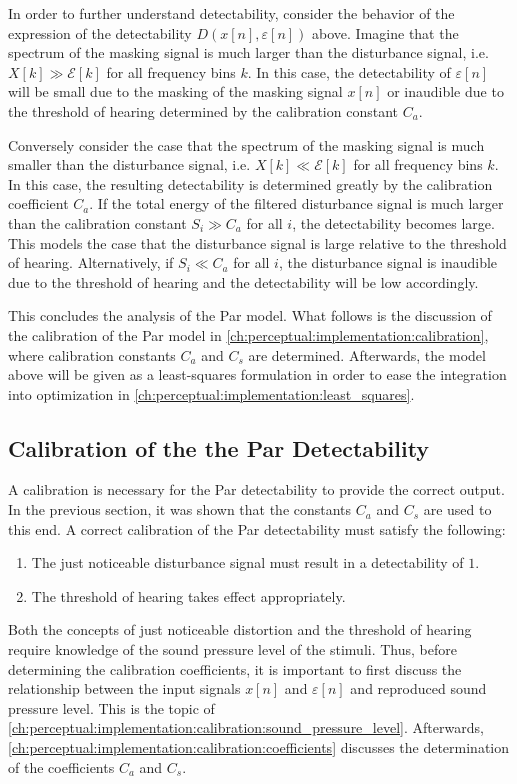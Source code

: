In order to further understand detectability, consider the behavior of the expression of the detectability $D(x[n],\varepsilon[n])$ above.
Imagine that the spectrum of the masking signal is much larger than the disturbance signal, 
i.e. $X[k] \gg \mathcal{E}[k]$ for all frequency bins $k$.
In this case, the detectability of $\varepsilon[n]$ will be small due to the masking of the masking signal $x[n]$ or
inaudible due to the threshold of hearing determined by the calibration constant $C_a$.

Conversely consider the case that the spectrum of the masking signal is much smaller than the disturbance signal,
i.e. $X[k] \ll \mathcal{E}[k]$ for all frequency bins $k$.
In this case, the resulting detectability is determined greatly by the calibration coefficient $C_a$. 
If the total energy of the filtered disturbance signal is much larger than the calibration constant 
$S_i \gg C_a$ for all $i$, the detectability becomes large.
This models the case that the disturbance signal is large relative to the threshold of hearing.
Alternatively, if $S_i \ll C_a$ for all $i$, the disturbance signal is inaudible due to the threshold of hearing and 
the detectability will be low accordingly.

This concludes the analysis of the Par model.
What follows is the discussion of the calibration of the Par model in \autoref{ch:perceptual:implementation:calibration},
where calibration constants $C_a$ and $C_s$ are determined.
Afterwards, the model above will be given as a least-squares formulation in order to ease the integration
into optimization in \autoref{ch:perceptual:implementation:least_squares}.

\subsection{Calibration of the the Par Detectability}
\label{ch:perceptual:implementation:calibration}
A calibration is necessary for the Par detectability to provide the correct output.
In the previous section, it was shown that the constants $C_a$ and $C_s$ are used to this end.
A correct calibration of the Par detectability must satisfy the following:
\begin{enumerate}
    \item The just noticeable disturbance signal must result in a detectability of $1$.
    \item The threshold of hearing takes effect appropriately.
\end{enumerate}
Both the concepts of just noticeable distortion and the threshold of hearing require knowledge of the 
sound pressure level of the stimuli.
Thus, before determining the calibration coefficients, it is important to first discuss the 
relationship between the input signals $x[n]$ and $\varepsilon[n]$ and reproduced sound pressure level.
This is the topic of \autoref{ch:perceptual:implementation:calibration:sound_pressure_level}.
Afterwards, \autoref{ch:perceptual:implementation:calibration:coefficients} discusses the determination of 
the coefficients $C_a$ and $C_s$. 

